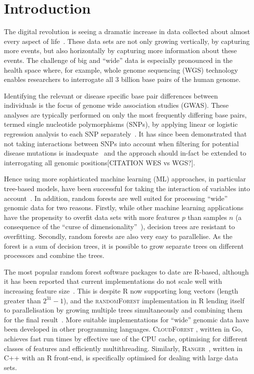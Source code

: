 \documentclass[10pt,letterpaper]{article}
\newcommand{\ranger}{\textsc{Ranger}\xspace}
\newcommand{\randomforest}{\textsc{randomForest}\xspace}
\begin{document}
\linenumbers

\section{Introduction}
The digital revolution is seeing a dramatic increase in data collected about almost every aspect of
life~\cite{Loebbecke2015}.  These data sets are not only growing vertically, by capturing more events, but also
horizontally by capturing more information about these events.  The challenge of big and ``wide'' data is especially
pronounced in the health space where, for example, whole genome sequencing (WGS) technology enables researchers to
interrogate all 3 billion base pairs of the human genome.

Identifying the relevant or disease specific base pair differences between individuals is the focus of genome wide
association studies (GWAS).  These analyses are typically performed on only the most frequently differing base pairs,
termed single nucleotide polymorphisms (SNPs), by applying linear or logistic regression analysis to each SNP
separately~\cite{CCC2007}.  It has since been demonstrated that not taking interactions between SNPs into account
when filtering for potential disease mutations is inadequate~\cite{Manolio2009,Yang2011} and the approach should 
in-fact be extended to interrogating all genomic positions[CITATION WES vs WGS?].

Hence using more sophisticated machine learning (ML) approaches, in particular tree-based models, have been successful
for taking the interaction of variables into account~\cite{Wright.et.al.2016}. In addition, random forests are well
suited for processing ``wide'' genomic data for two reasons.  Firstly, while other machine learning applications have
the propensity to overfit data sets with more features $p$ than samples $n$ (a consequence of the ``curse of
dimensionality''~\cite{Bauer2014, bellman1961adaptive}), decision trees are resistant to overfitting.  Secondly, random
forests are also very easy to parallelise. As the forest is a sum of decision trees, it is possible to grow separate
trees on different processors and combine the trees. 

The most popular random forest software packages to date are R-based, although it has been reported that current implementations 
do not scale well with increasing feature size~\cite{Wright.and.Ziegle.2016}.  This is despite R now supporting long vectors (length greater
than $2^{31}-1$), and the \randomforest implementation in R lending itself to parallelisation by growing multiple
trees simultaneously and combining them for the final result~\cite{Liaw.and.Weiner.2002}.  More suitable implementations for ``wide''
genomic data have been developed in other programming languages. \textsc{CloudForest} \cite{Bressler2015}, written in Go,
achieves fast run times by effective use of the CPU cache, optimising for different classes of features and efficiently
multithreading.  Similarly, \ranger~\cite{Wright.and.Ziegle.2016}, written in C++ with an R front-end, is
specifically optimised for dealing with large data sets.
\end{document}
